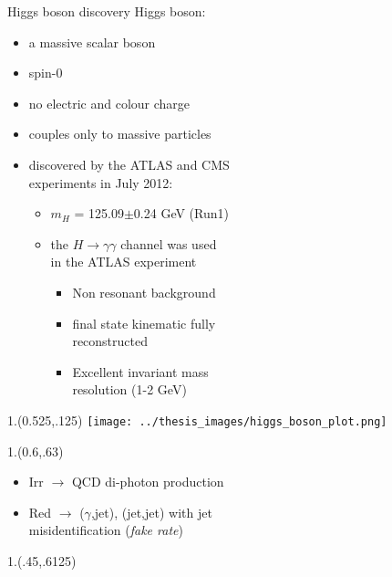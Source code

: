\documentclass[10pt,UKenglish, leqno, xcolor = dvipsnames]{beamer}
\begin{document}
	\begin{frame}{Higgs boson discovery}
		\vfill
		Higgs boson:
		\begin{itemize}
			\item a massive scalar boson
			\item spin-0
			\item no electric and colour charge
			\item couples only to massive particles
			\item discovered by the ATLAS and CMS\\ experiments in July 2012:
			\begin{itemize}
				\item $m_H$ = 125.09$\pm$0.24 GeV (Run1)
				\item the $H \to \gamma\gamma$ channel was used\\ in the ATLAS experiment
				\begin{itemize}
					\item Non resonant background
					\item final state kinematic fully\\ reconstructed
					\item Excellent invariant mass\\ resolution (1-2 GeV)
				\end{itemize}
			\end{itemize}
		\end{itemize}
		\vfill
		\begin{textblock}{1.}(0.525,.125)
			\texttt{[image: ../thesis\_images/higgs\_boson\_plot.png]}
		\end{textblock}
		\begin{textblock}{1.}(0.6,.63)
			\begin{itemize}
				\footnotesize
				\item Irr $\to$ QCD di-photon production
				\vspace{.2cm}
				\item Red $\to$ ($\gamma$,jet), (jet,jet) with jet\\ misidentification (\textit{fake rate})
			\end{itemize}
		\end{textblock}
		\begin{textblock}{1.}(.45,.6125)
		\end{textblock}
	\end{frame}
\end{document}
